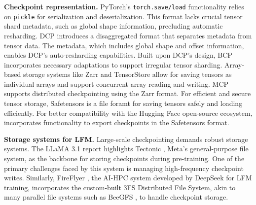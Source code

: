 \noindent \textbf{Checkpoint representation.} PyTorch's \texttt{torch.save/load} functionality relies on \texttt{pickle} for serialization and deserialization. %
This format lacks crucial tensor shard metadata, such as global shape information, precluding automatic resharding. DCP \cite{torch-dcp} introduces a disaggregated format that separates metadata from tensor data. The metadata, which includes global shape and offset information, enables DCP's auto-resharding capabilities.
Built upon DCP's design, BCP incorporates necessary adaptations to support irregular tensor sharding. Array-based storage systems like Zarr \cite{zarrZarr} and TensorStore \cite{googleTensorStore} allow for saving tensors as individual arrays and support concurrent array reading and writing. MCP \cite{megatron-dcp} supports distributed checkpointing using the Zarr format.
For efficient and secure tensor storage, Safetensors \cite{huggingfaceSafetensors} is a file foramt for saving tensors safely and loading efficiently. For better compatibility with the Hugging Face open-source ecosystem, \sys{} incorporates functionality to export checkpoints in the Safetensors format.

\noindent \textbf{Storage systems for LFM.} Large-scale checkpointing demands robust storage systems. The LLaMA 3.1 report \cite{llama3.1} highlights Tectonic \cite{tectonic}, Meta's general-purpose file system, as the backbone for storing checkpoints during pre-training. One of the primary challenges faced by this system is managing high-frequency checkpoint writes. Similarly, FireFlyer \cite{fireflyer}, the AI-HPC system developed by DeepSeek \cite{deepseekai} for LFM training, incorporates the custom-built 3FS Distributed File System, akin to many parallel file systems such as BeeGFS \cite{herold2014introduction}, to handle checkpoint storage. %



